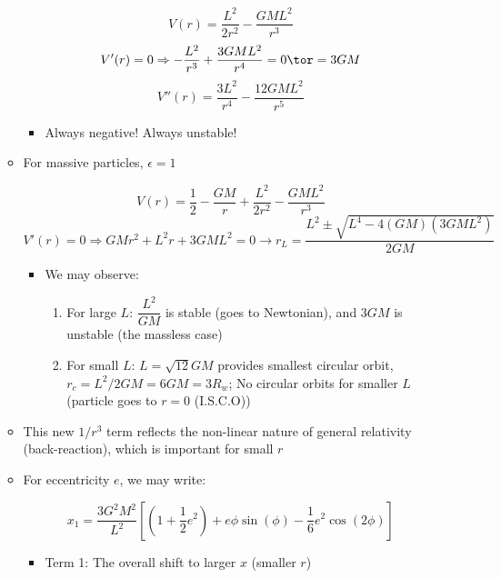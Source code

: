 \begin{itemize}
\begin{itemize}
        $$V(r)=\frac{L^2}{2r^2}-\frac{GML^2}{r^3}$$
        $$V'(r)=0\Rightarrow-\frac{L^2}{r^3}+\frac{3GML^2}{r^4}=0\tor=3GM$$
        $$V''(r)=\frac{3L^2}{r^4}-\frac{12GML^2}{r^5}$$

        \begin{itemize}

          \item Always negative! Always unstable!

        \end{itemize}

      \item For massive particles, $\epsilon=1$

        $$V(r)=\frac{1}{2}-\frac{GM}{r}+\frac{L^2}{2r^2}-\frac{GML^2}{r^3}$$
        $$V'(r)=0\Rightarrow GMr^2+L^2r+3GML^2=0\to r_L=\frac{L^2\pm\sqrt{L^4-4(GM)(3GML^2)}}{2GM}$$

        \begin{itemize}

          \item We may observe:

            \begin{enumerate}

              \item For large $L$: $\dfrac{L^2}{GM}$ is stable (goes to Newtonian), and $3GM$ is unstable (the massless case)

              \item For small $L$: $L=\sqrt{12}GM$ provides smallest circular orbit, $r_c=L^2/2GM=6GM=3R_w$; No circular orbits for smaller $L$ (particle goes to $r=0$ (I.S.C.O))

            \end{enumerate}

        \end{itemize}

      \item This new $1/r^3$ term reflects the non-linear nature of general relativity (back-reaction), which is important for small $r$

      \item For eccentricity $e$, we may write:

        $$x_1=\frac{3G^2M^2}{L^2}\left[ \left( 1+\frac{1}{2}e^2 \right)+e\phi\sin(\phi)-\frac{1}{6}e^2\cos(2\phi) \right]$$

        \begin{itemize}

          \item Term 1: The overall shift to larger $x$ (smaller $r$)


\end{itemize}
\end{itemize}
\end{itemize}
